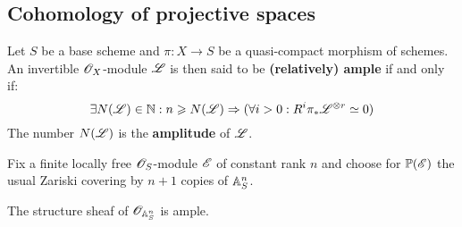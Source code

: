         \subsection{Cohomology of projective spaces}
            \begin{definition} \label{def: ample_invertible_modules}
                Let $S$ be a base scheme and $\pi: X \to S$ be a quasi-compact morphism of schemes. An invertible $\mathscr{O}_X$-module $\mathscr{L}$ is then said to be \textbf{(relatively) ample} if and only if:
                    $$\exists N(\scrL) \in \N: n \geq N(\scrL) \implies ( \forall i > 0: R^i\pi_*\scrL^{\tensor r} \cong 0 )$$
                The number $N(\mathscr{L})$ is the \textbf{amplitude} of $\mathscr{L}$.
            \end{definition}
        
            Fix a finite locally free $\mathscr{O}_S$-module $\mathscr{E}$ of constant rank $n$ and choose for $\mathbb{P}(\mathscr{E})$ the usual Zariski covering by $n + 1$ copies of $\mathbb{A}^n_S$. 
            \begin{lemma}
                The structure sheaf of $\mathscr{O}_{\mathbb{A}^n_S}$ is ample. 
            \end{lemma}


    
    
    \printbibliography

